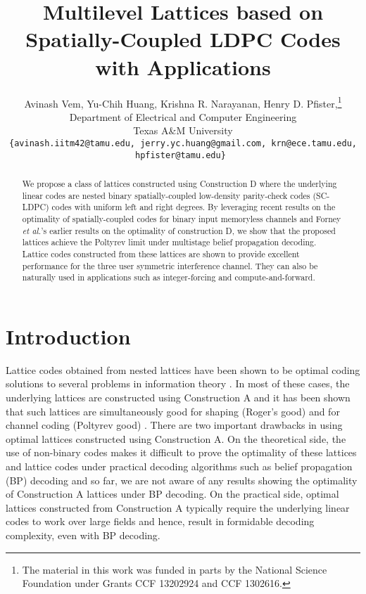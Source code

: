 \documentclass[conference]{IEEEtran}
\begin{document}
\title{Multilevel Lattices based on Spatially-Coupled LDPC Codes with Applications}
\author{Avinash Vem, Yu-Chih Huang, Krishna R. Narayanan, Henry D. Pfister,\thanks{The material in this work was funded in parts by the National Science Foundation under Grants CCF 13202924 and CCF 1302616.
}\\
Department of Electrical and Computer Engineering \\
Texas A\&M University\\
{\tt\small {\{avinash.iitm42@tamu.edu, jerry.yc.huang@gmail.com, krn@ece.tamu.edu, hpfister@tamu.edu\}} }}

\maketitle

\begin{abstract}
We propose a class of lattices constructed using Construction D where the underlying linear codes are nested binary spatially-coupled low-density parity-check codes (SC-LDPC) codes with uniform left and right degrees. By leveraging recent results on the optimality of spatially-coupled codes for binary input memoryless channels and Forney {\em et al.}'s earlier results on the optimality of construction D, we show that the proposed lattices achieve the Poltyrev limit under multistage belief propagation decoding. Lattice codes constructed from these lattices are shown to provide excellent performance for the three user symmetric interference channel. They can also be naturally used in applications such as integer-forcing and compute-and-forward.
\end{abstract}


\section{Introduction}
Lattice codes obtained from nested lattices have been shown to be optimal coding solutions to several problems in information theory \cite{erez05}. In most of these cases, the underlying lattices are constructed using Construction A and it has been shown that such lattices are simultaneously good for shaping (Roger's good) and for channel coding (Poltyrev good) \cite{erez05}. There are two important drawbacks in using optimal lattices constructed using Construction A. On the theoretical side, the use of non-binary codes makes it difficult to prove the optimality of these lattices and lattice codes under practical decoding algorithms such as belief propagation (BP) decoding and so far, we are not aware of any results showing the optimality of Construction A lattices under BP decoding. On the practical side, optimal lattices constructed from Construction A typically require the underlying linear codes to work over large fields and hence, result in formidable decoding complexity, even with BP decoding.
\end{document}
